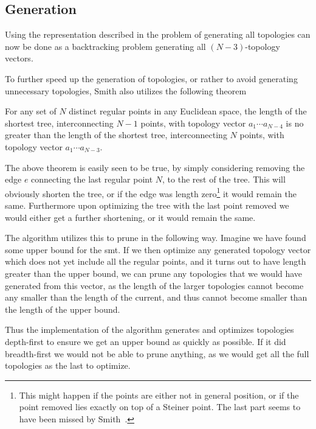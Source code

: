 \subsection{Generation}
\label{sec:generation}

Using the representation described in  the problem of
generating all topologies can now be done as a backtracking problem generating
all $(N-3)$-topology vectors.

To further speed up the generation of topologies, or rather to avoid generating
unnecessary topologies, Smith also utilizes the following theorem

\begin{theorem}
For any set of $N$ distinct regular points in any Euclidean space, the length of
the shortest tree, interconnecting $N-1$ points, with topology vector $a_1
\cdots a_{N-4}$ is no greater than the length of the shortest tree,
interconnecting $N$ points, with topology vector $a_1 \cdots a_{N-3}$.
\end{theorem}

The above theorem is easily seen to be true, by simply considering removing the
edge $e$ connecting the last regular point $N$, to the rest of the tree. This
will obviously shorten the tree, or if the edge was length zero\footnote{This
  might happen if the points are either not in general position, or if the point
  removed lies exactly on top of a Steiner point. The last part seems to have
  been missed by Smith~\cite[p.~144]{Smith1992}.} it would remain the
same. Furthermore upon optimizing the tree with the last point removed we would
either get a further shortening, or it would remain the same.

The algorithm utilizes this to prune in the following way. Imagine we have found
some upper bound for the \gls{smt}. If we then optimize any generated topology
vector which does not yet include all the regular points, and it turns out to
have length greater than the upper bound, we can prune any topologies that we
would have generated from this vector, as the length of the larger topologies
cannot become any smaller than the length of the current, and thus cannot become
smaller than the length of the upper bound.

Thus the implementation of the algorithm generates and optimizes topologies
depth-first to ensure we get an upper bound as quickly as possible. If it did
breadth-first we would not be able to prune anything, as we would get all the
full topologies as the last to optimize.

